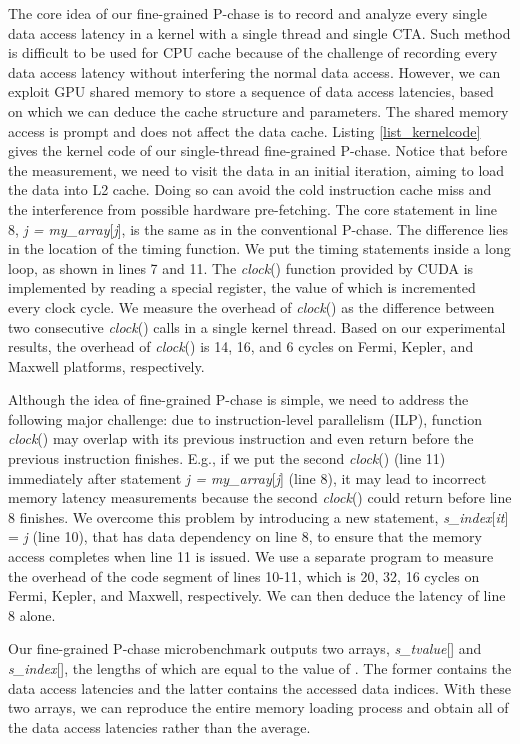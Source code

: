 \documentclass[10pt,journal,compsoc]{IEEEtran}
\theoremstyle{definition}
\begin{document}
The core idea of our fine-grained P-chase is to record and analyze every single data access latency in a kernel with a single thread and single CTA. Such method is difficult to be used for CPU cache because of the challenge of recording every data access latency without interfering the normal data access. However, we can exploit GPU shared memory to store a sequence of data access latencies, based on which we can deduce the cache structure and parameters. The shared memory access is prompt and does not affect the data cache. Listing \ref{list_kernelcode} gives the kernel code of our single-thread fine-grained P-chase. Notice that before the measurement, we need to visit the data in an initial iteration, aiming to load the data into L2 cache. Doing so can avoid the cold instruction cache miss and the interference from possible hardware pre-fetching. The core statement in line 8, \emph{j = my\_array}[\emph{j}], is the same as in the conventional P-chase. The difference lies in the location of the timing function. We put the timing statements inside a long loop, as shown in lines 7 and 11. The \emph{clock}() function provided by CUDA is implemented by reading a special register, the value of which is incremented every clock cycle. We measure the overhead of \emph{clock}() as the difference between two consecutive \emph{clock}() calls in a single kernel thread. Based on our experimental results, the overhead of \emph{clock}() is 14, 16, and 6 cycles on Fermi, Kepler, and Maxwell platforms, respectively.

Although the idea of fine-grained P-chase is simple, we need to address the following major challenge: due to instruction-level parallelism (ILP), function \emph{clock}() may overlap with its previous instruction and even return before the previous instruction finishes. E.g., if we put the second \emph{clock}() (line 11) immediately after statement \emph{j = my\_array}[\emph{j}] (line 8), it may lead to incorrect memory latency measurements because the second \emph{clock}() could return before line 8 finishes. We overcome this problem by introducing a new statement, \emph{s\_index}[\emph{it}] = \emph{j} (line 10), that has data dependency on line 8, to ensure that the memory access completes when line 11 is issued. We use a separate program to measure the overhead of the code segment of lines 10-11, which is 20, 32, 16 cycles on Fermi, Kepler, and Maxwell, respectively. We can then deduce the latency of line 8 alone.

Our fine-grained P-chase microbenchmark outputs two arrays, \emph{s\_tvalue}[] and \emph{s\_index}[], the lengths of which are equal to the value of . The former contains the data access latencies and the latter contains the accessed data indices. With these two arrays, we can reproduce the entire memory loading process and obtain all of the data access latencies rather than the average.
\end{document}
